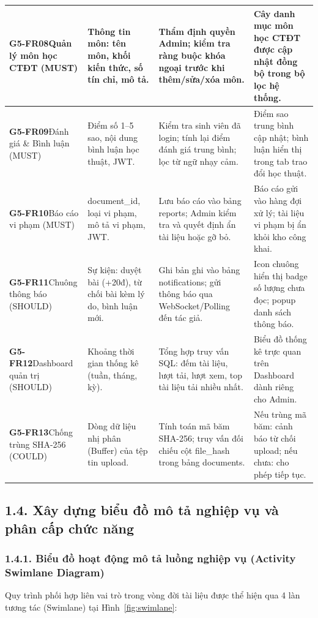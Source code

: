 \begin{table}[htbp]
\begin{tabularx}{\textwidth}{|p{2.6cm}|X|X|X|}
\hline
\textbf{G5-FR08}\newline Quản lý môn học CTĐT (MUST) & Thông tin môn: tên môn, khối kiến thức, số tín chỉ, mô tả. & Thẩm định quyền Admin; kiểm tra ràng buộc khóa ngoại trước khi thêm/sửa/xóa môn. & Cây danh mục môn học CTĐT được cập nhật đồng bộ trong bộ lọc hệ thống. \\
\hline
\textbf{G5-FR09}\newline Đánh giá \& Bình luận (MUST) & Điểm số 1--5 sao, nội dung bình luận học thuật, JWT. & Kiểm tra sinh viên đã login; tính lại điểm đánh giá trung bình; lọc từ ngữ nhạy cảm. & Điểm sao trung bình cập nhật; bình luận hiển thị trong tab trao đổi học thuật. \\
\hline
\textbf{G5-FR10}\newline Báo cáo vi phạm (MUST) & document\_id, loại vi phạm, mô tả vi phạm, JWT. & Lưu báo cáo vào bảng reports; Admin kiểm tra và quyết định ẩn tài liệu hoặc gỡ bỏ. & Báo cáo gửi vào hàng đợi xử lý; tài liệu vi phạm bị ẩn khỏi kho công khai. \\
\hline
\textbf{G5-FR11}\newline Chuông thông báo (SHOULD) & Sự kiện: duyệt bài (+20đ), từ chối bài kèm lý do, bình luận mới. & Ghi bản ghi vào bảng notifications; gửi thông báo qua WebSocket/Polling đến tác giả. & Icon chuông hiển thị badge số lượng chưa đọc; popup danh sách thông báo. \\
\hline
\textbf{G5-FR12}\newline Dashboard quản trị (SHOULD) & Khoảng thời gian thống kê (tuần, tháng, kỳ). & Tổng hợp truy vấn SQL: đếm tài liệu, lượt tải, lượt xem, top tài liệu tải nhiều nhất. & Biểu đồ thống kê trực quan trên Dashboard dành riêng cho Admin. \\
\hline
\textbf{G5-FR13}\newline Chống trùng SHA-256 (COULD) & Dòng dữ liệu nhị phân (Buffer) của tệp tin upload. & Tính toán mã băm SHA-256; truy vấn đối chiếu cột file\_hash trong bảng documents. & Nếu trùng mã băm: cảnh báo từ chối upload; nếu chưa: cho phép tiếp tục. \\
\hline
\end{tabularx}
\end{table}

\subsection{1.4. Xây dựng biểu đồ mô tả nghiệp vụ và phân cấp chức năng}

\subsubsection{1.4.1. Biểu đồ hoạt động mô tả luồng nghiệp vụ (Activity Swimlane Diagram)}
Quy trình phối hợp liên vai trò trong vòng đời tài liệu được thể hiện qua 4 làn tương tác (Swimlane) tại Hình~\ref{fig:swimlane}:


